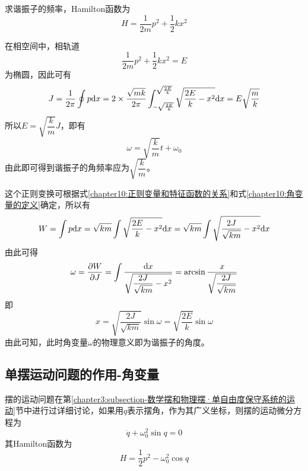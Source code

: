 \begin{example}
求谐振子的频率，Hamilton函数为
\begin{equation*}
	H = \frac{1}{2m}p^2 + \frac12 kx^2
\end{equation*}
\end{example}
\begin{solution}
在相空间中，相轨道
\begin{equation*}
	\frac{1}{2m}p^2 + \frac12 kx^2 = E
\end{equation*}
为椭圆，因此可有
\begin{equation*}
	J = \frac{1}{2\pi} \oint p\mathrm{d} x = 2\times\frac{\sqrt{mk}}{2\pi} \int_{-\sqrt{\frac{2E}{k}}}^{\sqrt{\frac{2E}{k}}} \sqrt{\frac{2E}{k}-x^2}\mathrm{d} x = E\sqrt{\frac{m}{k}}
\end{equation*}
所以$E = \sqrt{\dfrac{k}{m}}J$，即有
\begin{equation*}
	\omega = \sqrt{\dfrac{k}{m}} t + \omega_0
\end{equation*}
由此即可得到谐振子的角频率应为$\sqrt{\dfrac{k}{m}}$。

这个正则变换可根据式\eqref{chapter10:正则变量和特征函数的关系}和式\eqref{chapter10:角变量的定义}确定，所以有
\begin{equation*}
	W = \int p\mathrm{d} x = \sqrt{km} \int \sqrt{\frac{2E}{k}-x^2}\mathrm{d} x = \sqrt{km} \int \sqrt{\frac{2J}{\sqrt{km}}-x^2}\mathrm{d} x
\end{equation*}
由此可得
\begin{equation*}
	\omega = \frac{\partial W}{\partial J} = \int \frac{\mathrm{d} x}{\sqrt{\dfrac{2J}{\sqrt{km}}-x^2}} = \arcsin \frac{x}{\sqrt{\dfrac{2J}{\sqrt{km}}}}
\end{equation*}
即
\begin{equation*}
	x = \sqrt{\dfrac{2J}{\sqrt{km}}}\sin \omega = \sqrt{\frac{2E}{k}} \sin \omega
\end{equation*}
由此可知，此时角变量$\omega$的物理意义即为谐振子的角度。
\end{solution}

\subsection{单摆运动问题的作用-角变量}

摆的运动问题在第\ref{chapter3:subsection-数学摆和物理摆·单自由度保守系统的运动}节中进行过详细讨论，如果用$q$表示摆角，作为其广义坐标，则摆的运动微分方程为
\begin{equation}
	\ddot{q} + \omega_0^2 \sin q = 0
\end{equation}
其Hamilton函数为
\begin{equation}
	H = \frac12 p^2 - \omega_0^2 \cos q
\end{equation}

